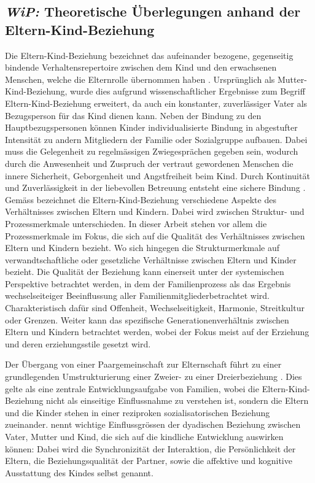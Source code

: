 \subsection{\textit{WiP:} Theoretische Überlegungen anhand der Eltern-Kind-Beziehung}\label{sec:TheretischeÜberlegungen}
Die Eltern-Kind-Beziehung bezeichnet das aufeinander bezogene, gegenseitig bindende Verhaltensrepertoire zwischen dem Kind und den erwachsenen Menschen, welche die Elternrolle übernommen haben \cite{ElternKindBeziehung1999}. Ursprünglich als Mutter-Kind-Beziehung, wurde dies aufgrund wissenschaftlicher Ergebnisse zum Begriff Eltern-Kind-Beziehung erweitert, da auch ein konstanter, zuverlässiger Vater als Bezugsperson für das Kind dienen kann. Neben der Bindung zu den Hauptbezugspersonen können Kinder individualisierte Bindung in abgestufter Intensität zu andern Mitgliedern der Familie oder Sozialgruppe aufbauen. Dabei muss die Gelegenheit zu regelmässigen Zwiegesprächen gegeben sein, wodurch durch die Anwesenheit und Zuspruch der vertraut gewordenen Menschen die innere Sicherheit, Geborgenheit und Angstfreiheit beim Kind. Durch Kontinuität und Zuverlässigkeit in der liebevollen Betreuung entsteht eine sichere Bindung \cite{ElternKindBeziehung1999}. Gemäss  bezeichnet die Eltern-Kind-Beziehung verschiedene Aspekte des Verhältnisses zwischen Eltern und Kindern. Dabei wird zwischen Struktur- und Prozessmerkmale unterschieden. In dieser Arbeit stehen vor allem die Prozessmerkmale im Fokus, die sich auf die Qualität des Verhältnisses zwischen Eltern und Kindern bezieht. Wo sich hingegen die Strukturmerkmale auf verwandtschaftliche oder gesetzliche Verhältnisse zwischen Eltern und Kinder bezieht. Die Qualität der Beziehung kann einerseit unter der systemischen Perspektive betrachtet werden, in dem der Familienprozess als das Ergebnis wechselseiteiger Beeinflussung aller Familienmitgliederbetrachtet wird. Charakteristisch dafür sind Offenheit, Wechselseitigkeit, Harmonie, Streitkultur oder Grenzen. Weiter kann das spezifische Generationenverhältnis zwischen Eltern und Kindern betrachtet werden, wobei der Fokus meist auf der Erziehung und deren erziehungsstile gesetzt wird. 

Der Übergang von einer Paargemeinschaft zur Elternschaft führt zu einer grundlegenden Umstrukturierung einer Zweier- zu einer Dreierbeziehung \cite{Hofer1992, Buergin1998}. Dies gelte als eine zentrale Entwicklungsaufgabe von Familien, wobei die Eltern-Kind-Beziehung nicht als einseitige Einflussnahme zu verstehen ist, sondern die Eltern und die Kinder stehen in einer reziproken sozialisatorischen Beziehung zueinander.  nennt wichtige Einflussgrössen der dyadischen Beziehung zwischen Vater, Mutter und Kind, die sich auf die kindliche Entwicklung auswirken können: Dabei wird die Synchronizität der Interaktion, die Persönlichkeit der Eltern, die Beziehungsqualität der Partner, sowie die affektive und kognitive Ausstattung des Kindes selbst genannt. 

